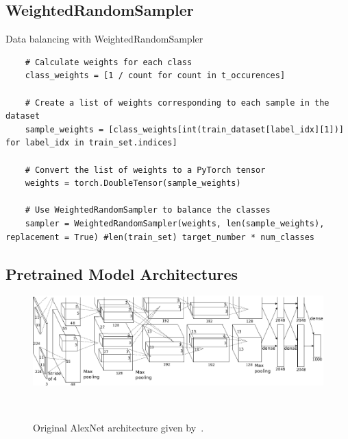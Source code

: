 \subsection{WeightedRandomSampler}\label{weightedsampler}
Data balancing with WeightedRandomSampler

\begin{verbatim}
    # Calculate weights for each class
    class_weights = [1 / count for count in t_occurences]

    # Create a list of weights corresponding to each sample in the dataset
    sample_weights = [class_weights[int(train_dataset[label_idx][1])] for label_idx in train_set.indices]

    # Convert the list of weights to a PyTorch tensor
    weights = torch.DoubleTensor(sample_weights)

    # Use WeightedRandomSampler to balance the classes
    sampler = WeightedRandomSampler(weights, len(sample_weights), replacement = True) #len(train_set) target_number * num_classes
\end{verbatim}



\subsection{Pretrained Model Architectures}\label{model_architectures}

\begin{figure}[h]
	\centering
	\includegraphics[scale=0.4]{./figures/AlexNet-architecture.png}
	\caption{Original AlexNet architecture given by~\citeauthor{AlexNetoriginal}.}~\label{fig:alexnet}
\end{figure}

